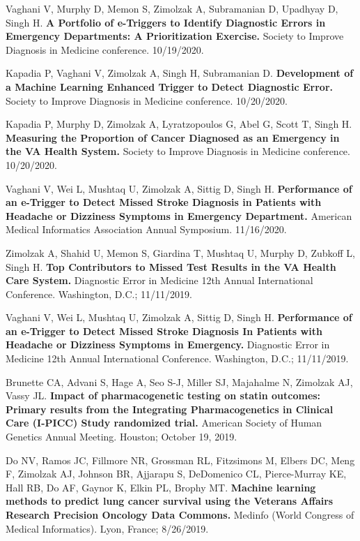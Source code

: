 \documentclass[10pt]{article}
\begin{document}
Vaghani V, Murphy D, Memon S, Zimolzak A, Subramanian D, Upadhyay D,
Singh H. \textbf{A Portfolio of e-Triggers to Identify Diagnostic
  Errors in Emergency Departments: A Prioritization Exercise.} Society
to Improve Diagnosis in Medicine conference. 10/19/2020.

Kapadia P, Vaghani V, Zimolzak A, Singh H, Subramanian D.
\textbf{Development of a Machine Learning Enhanced Trigger to Detect
  Diagnostic Error.} Society to Improve Diagnosis in Medicine
conference. 10/20/2020.

Kapadia P, Murphy D, Zimolzak A, Lyratzopoulos G, Abel G, Scott T,
Singh H. \textbf{Measuring the Proportion of Cancer Diagnosed as an
  Emergency in the VA Health System.} Society to Improve Diagnosis in
Medicine conference. 10/20/2020.


Vaghani V, Wei L, Mushtaq U, Zimolzak A, Sittig D, Singh H.
\textbf{Performance of an e-Trigger to Detect Missed Stroke Diagnosis
  in Patients with Headache or Dizziness Symptoms in Emergency
  Department.} American Medical Informatics
Association Annual Symposium. 11/16/2020.


Zimolzak A, Shahid U, Memon S, Giardina T, Mushtaq U, Murphy D,
Zubkoff L, Singh H. \textbf{Top Contributors to Missed Test Results in
  the VA Health Care System.} Diagnostic Error in Medicine 12th Annual
International Conference. Washington, D.C.; 11/11/2019.

Vaghani V, Wei L, Mushtaq U, Zimolzak A, Sittig D, Singh H.
\textbf{Performance of an e-Trigger to Detect Missed Stroke Diagnosis
  In Patients with Headache or Dizziness Symptoms in Emergency.}
Diagnostic Error in Medicine 12th Annual International Conference.
Washington, D.C.; 11/11/2019.


Brunette CA, Advani S, Hage A, Seo S-J, Miller SJ, Majahalme N,
Zimolzak AJ, Vassy JL. \textbf{Impact of pharmacogenetic testing on
  statin outcomes: Primary results from the Integrating
  Pharmacogenetics in Clinical Care (I-PICC) Study randomized trial.}
American Society of Human Genetics Annual Meeting. Houston; October
19, 2019.

Do NV, Ramos JC, Fillmore NR, Grossman RL, Fitzsimons M, Elbers DC,
Meng F, Zimolzak AJ, Johnson BR, Ajjarapu S, DeDomenico CL,
Pierce-Murray KE, Hall RB, Do AF, Gaynor K, Elkin PL, Brophy MT.
\textbf{Machine learning methods to predict lung cancer survival using
  the Veterans Affairs Research Precision Oncology Data Commons.}
Medinfo (World Congress of Medical Informatics). Lyon, France;
8/26/2019.
\end{document}
